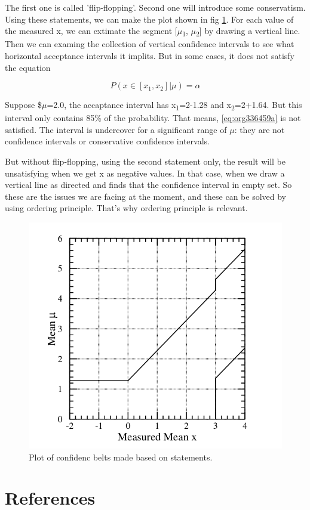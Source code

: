 \documentclass[a4paper,11pt]{article}
\begin{document}
The first one is called 'flip-flopping'. Second one will introduce some conservatism. Using these statements, we can make the plot shown in fig \ref{fig:org2aaa842}. For each value of the measured x, we can extimate the segment [\(\mu\)\textsubscript{1}, \(\mu\)\textsubscript{2}] by drawing a vertical line. Then we can examing the collection of vertical confidence intervals to see what horizontal acceptance intervals it implits. But in some cases, it does not satisfy the equation

\begin{equation}
\label{eq:org336459a}
P(x\in[x_1, x_2]|\mu)=\alpha
\end{equation}

Suppose \$\(\mu\)=2.0, the accaptance interval has x\textsubscript{1}=2-1.28 and x\textsubscript{2}=2+1.64. But this interval only contains 85\% of the probability. That means, \ref{eq:org336459a} is not satisfied. The interval is undercover for a significant range of \(\mu\): they are not confidence intervals or conservative confidence intervals.

But without flip-flopping, using the second statement only, the result will be unsatisfying when we get x as negative values. In that case, when we draw a vertical line as directed and finds that the confidence interval in empty set. So these are the issues we are facing at the moment, and these can be solved by using ordering principle. That's why ordering principle is relevant.
\begin{figure}[htbp]
\centering
\includegraphics[width=.9\linewidth]{fig_4.png}
\caption{\label{fig:org2aaa842}Plot of confidenc belts made based on statements. \cite{1998}}
\end{figure}


\section*{References}
\label{sec:orgffb0890}


\end{document}
